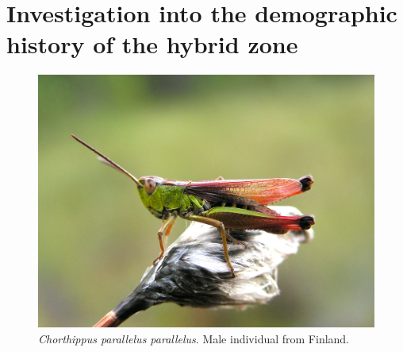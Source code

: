 \documentclass[a4paper,12pt,times,print,index,custombib,custommargin]{PhDThesisPSnPDF}\usepackage[]{graphicx}\usepackage[]{color}
\begin{document}
\tableofcontents
%
%
%
\listoftodos

\printglossaries


\ifpdf
    \graphicspath{
    {./Figs/Raster/}
    {./Figs/PDF/}
    {./Figs/}
    {../Data_analysis/reference-mapping/figure/}
    }
\else
    \graphicspath{ 
    {./Figs/Vector/}
    {./Figs/}
    {/Users/Claudius/Documents/PhD/THESIS/kks32/LaTeX/2_Chapter/Figs/Raster/}
    }
\fi

%
%
%
\chapter{Investigation into the demographic history of the hybrid zone}
%
%
%
\begin{figure}[htb]
\centering
\includegraphics[width=.9\linewidth]{grasshopper}
\caption{\textit{Chorthippus parallelus parallelus}. Male individual from Finland.}
\label{Fig:grasshopper}
\end{figure}


%
%
\end{document}
